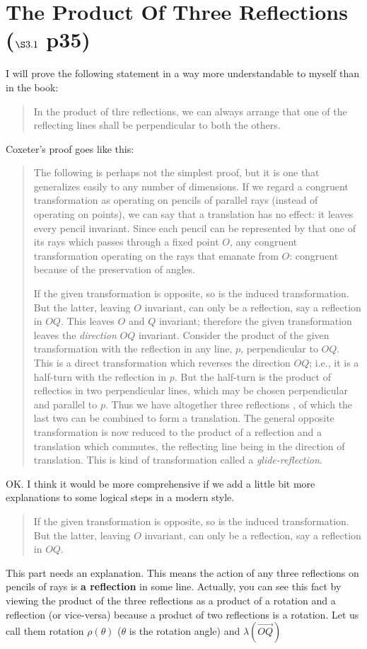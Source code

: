 \documentclass{article}
\begin{document}
\section{The Product Of Three Reflections ($\S\text{3.1}$ p35)}
\label{sec-3}
I will prove the following statement in a way more understandable to myself than in the book:
\begin{quote}
In the product of thre reflections, we can always arrange that one of the reflecting lines shall be perpendicular to both the others.
\end{quote}
Coxeter's proof goes like this:
\begin{quote}
The following is perhaps not the simplest proof, but it is one that generalizes easily to any number of dimensions.
 If we regard a congruent transformation as operating on pencils of parallel rays (instead of operating on points), we can say that a translation has no effect: it leaves every pencil invariant.
 Since each pencil can be represented by that one of its rays which passes through a fixed point $O$,
 any congruent transformation operating on the rays that emanate from $O$: congruent because of the preservation of angles.

If the given transformation is opposite, so is the induced transformation.
 But the latter, leaving $O$ invariant, can only be a reflection, say a reflection in $OQ$.
 This leaves  $O$ and $Q$ invariant; therefore the given transformation leaves the \emph{direction} $OQ$ invariant.
 Consider the product of the given transformation with the reflection in any line, $p$, perpendicular to $OQ$.
 This is a direct transformation which reverses the direction $OQ$; i.e., it is a half-turn with the reflection in $p$.
 But the half-turn is the product of reflectios in two perpendicular lines, which may be chosen perpendicular and parallel to $p$.
 Thus we have altogether three reflections , of which the last two can be combined to form a translation.
 The general opposite transformation is now reduced to the product of a reflection and a translation which commutes, the reflecting line being in the direction of translation.
 This is kind of transformation called  a \emph{glide-reflection}.
\end{quote}
OK. I think it would be more comprehensive if we add a little bit more explanations to some logical steps in a modern style. 
\begin{quote}
If the given transformation is opposite, so is the induced transformation.
 But the latter, leaving $O$ invariant, can only be a reflection, say a reflection in $OQ$.
\end{quote}
This part needs an explanation. This means the action of any three reflections on pencils of rays is \textbf{a reflection} in some line. 
Actually, you can see this fact by viewing the product of the three reflections as a product of a rotation and a reflection (or vice-versa) because a product of two reflections is a rotation. 
Let us call them rotation $\rho(\theta)$ ($\theta$ is the rotation angle) and $\lambda(\overrightarrow{OQ})$
\end{document}
